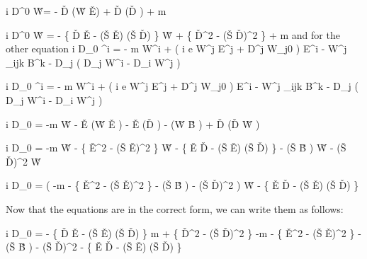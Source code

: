 \beq
	i D^0 \v{W}= - \v{D}   (\v{W} \cdot \v{E}) +  \v{D} (\v{D} \cdot \gv{\eta}) + m \gv{\eta}
\eeq

\beq
	i D^0 \v{W} = 
		- \{ \v{D} \cdot \v{E} - (\v{S} \cdot \v{E}) (\v{S} \cdot \v{D})	\} \v{W}
		+ \{ \v{D}^2 -  (\v{S} \cdot \v{D})^2 \} \gv{\eta} + m \gv{\eta}
\eeq
and for the other equation
\beq
	i D_0 \eta^i = - m W^i  +  \left( i e \lambda W^j E^j + D^j W_{j0} \right ) E^i
	-  W^j \epsilon_{ijk} B^k - D_j (  D_j W^i - D_i W^j )
\eeq

\beq
	i D_0 \eta^i = - m W^i  +  \left( i e \lambda W^j E^j + D^j W_{j0} \right ) E^i
	-  W^j \epsilon_{ijk} B^k - D_j (  D_j W^i - D_i W^j )
\eeq

\beq
	i D_0 \gv{\eta} = -m \v{W} 
			-  \v{E} (\v{W} \cdot \v{E} )
			- \v{E} (\v{D} \cdot \gv{\eta})
			-  (\v{W} \times \v{B} )
			+ \v{D} \times (\v{D} \times \v{W} ) 
\eeq

\beq
	i D_0 \gv{\eta} = -m \v{W} 
			-  \{ \v{E}^2 - (\v{S} \cdot \v{E})^2 \} \v{W}
			- \{ \v{E} \cdot \v{D} - (\v{S} \cdot \v{E}) (\v{S} \cdot \v{D}) \} \gv{\eta}
			-  (\v{S} \cdot \v{B} ) \v{W}
			 -  (\v{S} \cdot \v{D})^2  \v{W}  
\eeq

\beq
	i D_0 \gv{\eta} = \left(
				-m 
				-  \{ \v{E}^2 - (\v{S} \cdot \v{E})^2 \} 
				-  (\v{S} \cdot \v{B} )
				-  (\v{S} \cdot \v{D})^2 
			\right ) \v{W} 
			- \{ \v{E} \cdot \v{D} - (\v{S} \cdot \v{E}) (\v{S} \cdot \v{D}) \} \gv{\eta}  
\eeq

Now that the equations are in the correct form, we can write them as follows:

\beq
i D_0  = 
	\Mblock
	{- \{ \v{D} \cdot \v{E} - (\v{S} \cdot \v{E}) (\v{S} \cdot \v{D})	\} }
	{m + \{ \v{D}^2 -  (\v{S} \cdot \v{D})^2 \}}
	{-m 		-  \{ \v{E}^2 - (\v{S} \cdot \v{E})^2 \} 
				-  (\v{S} \cdot \v{B} )
				-  (\v{S} \cdot \v{D})^2 }
	{- \{ \v{E} \cdot \v{D} - (\v{S} \cdot \v{E}) (\v{S} \cdot \v{D}) \}}
\eeq

